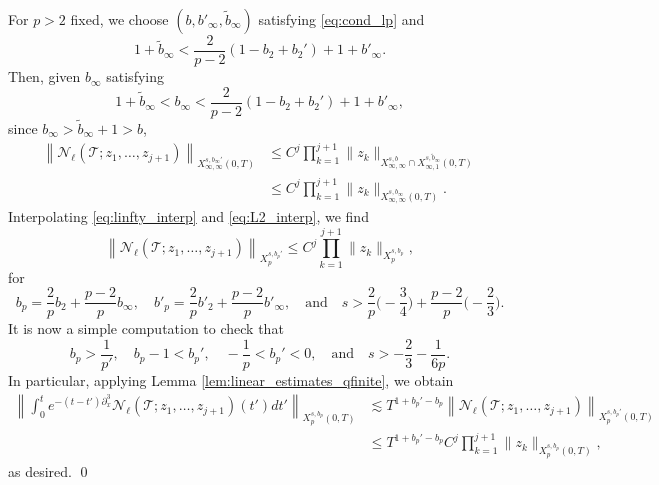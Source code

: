 \documentclass[a4paper,
11pt,  reqno]{amsart}
\newcommand{\5}{\textup{V}}
\newcommand{\wt}{\widetilde}
\newcommand{\dx}{\partial_x}
\theoremstyle{remark}
\newcommand{\TT}{\mathcal{T}}
\renewcommand{\l}{\ell}
\numberwithin{equation}{section}
\numberwithin{theorem}{section}
\newcommand{\Ncal}{\mathcal{N}}
\begin{document}
For $p>2$ fixed, we choose $(b, b'_\infty, \wt{b}_\infty)$ satisfying \eqref{eq:cond_lp} and
\begin{equation}
    1+\wt{b}_\infty <\frac{2}{p-2}(1-b_2+b_2') + 1 + b'_\infty.
\end{equation}
Then, given $b_\infty$ satisfying
\begin{equation}
    1+\wt{b}_\infty<b_\infty <\frac{2}{p-2}(1-b_2+b_2') + 1 + b'_\infty,
\end{equation}
since $b_\infty>\wt{b}_\infty+1>b$,
\begin{align}
    \left\| \Ncal_\l(\TT; z_1,\dots, z_{j+1})\right\|_{X^{s,b_\infty'}_{\infty, \infty}(0,T)} &\le  C^j\prod_{k=1}^{j+1}\|z_k\|_{X^{s,b}_{\infty, \infty}\cap X^{s,\wt{b}_\infty}_{\infty,1}(0,T)}\\&\le  C^j\prod_{k=1}^{j+1}\|z_k\|_{X^{s,b_\infty}_{\infty, \infty}(0,T)}.\label{eq:linfty_interp}
\end{align}
Interpolating \eqref{eq:linfty_interp} and \eqref{eq:L2_interp}, we find
\begin{equation}\label{eq:Lp_interp}
		\left\| \Ncal_\l(\TT; z_1,\dots, z_{j+1})\right\|_{X^{s,b_p'}_{p}}  \le  C^j\prod_{k=1}^{j+1}\|z_k\|_{X^{s,b_p}_{p}},
\end{equation}
for
$$
b_p=\frac{2}{p}b_2+\frac{p-2}{p}b_\infty,
\quad
b'_p=\frac{2}{p}b'_2+\frac{p-2}{p}b'_\infty,
\quad
\text{and}
\quad
s> \frac2p \Big(-\frac34\Big) + \frac{p-2}{p} \Big(-\frac23\Big)
.
$$
It is now a simple computation to check that
$$
b_p>\frac1{p'},
\quad b_p-1<b_p',
\quad
-\frac{1}{p}<b_p'<0,
\quad
\text{and}
\quad
s> -\frac23 - \frac{1}{6p}.
$$
In particular, applying Lemma \ref{lem:linear_estimates_qfinite}, we obtain
	\begin{align}
		\left\|\int_0^t e^{-(t-t')\dx^3} \Ncal_\l(\TT; z_1,\dots, z_{j+1})(t') dt'  \right\|_{X^{s,b_p}_{p}(0,T)}
        &	\lesssim T^{1+b_p'-b_p}\left\|\Ncal_\l(\TT; z_1,\dots, z_{j+1})  \right\|_{X^{s,b_p'}_{p} (0,T)}
        \\
        &\le T^{1+b_p'-b_p} C^j\prod_{k=1}^{j+1}\|z_k\|_{X^{s,b_p}_{p}(0,T)},
	\end{align}
as desired.
\qed
\end{document}

